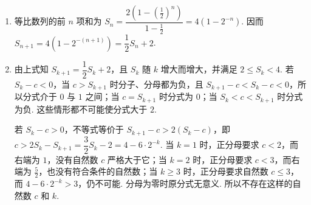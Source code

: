 \begin{solution}
\begin{enumerate}
\item 等比数列的前 \(n\) 项和为 \(S_n=\dfrac{2\left(1-\left(\frac12\right)^n\right)}{1-\frac12}=4\left(1-2^{-n}\right)\). 因而 \(S_{n+1}=4\left(1-2^{-(n+1)}\right)=\dfrac12S_n+2\).

\item 由上式知 \(S_{k+1}=\dfrac12S_k+2\)，且 \(S_k\) 随 \(k\) 增大而增大，并满足 \(2\leqslant S_k<4\). 若 \(S_k-c<0\)，当 \(c>S_{k+1}\) 时分子、分母都为负，且 \(S_{k+1}-c<S_k-c<0\)，所以分式介于 \(0\) 与 \(1\) 之间；当 \(c=S_{k+1}\) 时分式为 \(0\)；当 \(S_k<c<S_{k+1}\) 时分式为负. 这些情形都不可能使分式大于 \(2\).

若 \(S_k-c>0\)，不等式等价于 \(S_{k+1}-c>2(S_k-c)\)，即 \(c>2S_k-S_{k+1}=\dfrac32S_k-2=4-6\cdot2^{-k}\). 当 \(k=1\) 时，正分母要求 \(c<2\)，而右端为 \(1\)，没有自然数 \(c\) 严格大于它；当 \(k=2\) 时，正分母要求 \(c<3\)，而右端为 \(\frac52\)，也没有符合条件的自然数；当 \(k\geqslant3\) 时，正分母要求自然数 \(c\leqslant3\)，而 \(4-6\cdot2^{-k}>3\)，仍不可能. 分母为零时原分式无意义. 所以不存在这样的自然数 \(c\) 和 \(k\).
\end{enumerate}
\end{solution}
